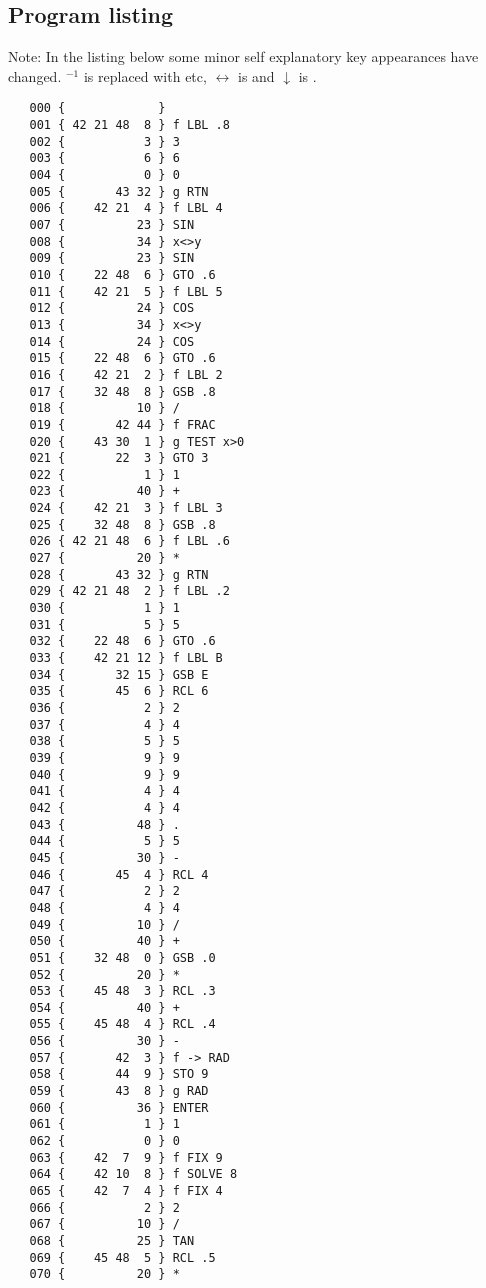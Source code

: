 \documentclass[swedish,a4paper,onepage, 11pt]{scrbook}
\begin{document}
\subsection*{Program listing}

Note: In the listing below some minor self explanatory key appearances have changed.  $^{-1}$ is replaced with  etc, $\leftrightarrow$ is  and $\downarrow$ is .
\begin{multicols}{2}
\begin{lstlisting}
   000 {             } 
   001 { 42 21 48  8 } f LBL .8
   002 {           3 } 3
   003 {           6 } 6
   004 {           0 } 0
   005 {       43 32 } g RTN
   006 {    42 21  4 } f LBL 4
   007 {          23 } SIN
   008 {          34 } x<>y
   009 {          23 } SIN
   010 {    22 48  6 } GTO .6
   011 {    42 21  5 } f LBL 5
   012 {          24 } COS
   013 {          34 } x<>y
   014 {          24 } COS
   015 {    22 48  6 } GTO .6
   016 {    42 21  2 } f LBL 2
   017 {    32 48  8 } GSB .8
   018 {          10 } /
   019 {       42 44 } f FRAC
   020 {    43 30  1 } g TEST x>0
   021 {       22  3 } GTO 3
   022 {           1 } 1
   023 {          40 } +
   024 {    42 21  3 } f LBL 3
   025 {    32 48  8 } GSB .8
   026 { 42 21 48  6 } f LBL .6
   027 {          20 } *
   028 {       43 32 } g RTN
   029 { 42 21 48  2 } f LBL .2
   030 {           1 } 1
   031 {           5 } 5
   032 {    22 48  6 } GTO .6
   033 {    42 21 12 } f LBL B
   034 {       32 15 } GSB E
   035 {       45  6 } RCL 6
   036 {           2 } 2
   037 {           4 } 4
   038 {           5 } 5
   039 {           9 } 9
   040 {           9 } 9
   041 {           4 } 4
   042 {           4 } 4
   043 {          48 } .
   044 {           5 } 5
   045 {          30 } -
   046 {       45  4 } RCL 4
   047 {           2 } 2
   048 {           4 } 4
   049 {          10 } /
   050 {          40 } +
   051 {    32 48  0 } GSB .0
   052 {          20 } *
   053 {    45 48  3 } RCL .3
   054 {          40 } +
   055 {    45 48  4 } RCL .4
   056 {          30 } -
   057 {       42  3 } f -> RAD
   058 {       44  9 } STO 9
   059 {       43  8 } g RAD
   060 {          36 } ENTER
   061 {           1 } 1
   062 {           0 } 0
   063 {    42  7  9 } f FIX 9
   064 {    42 10  8 } f SOLVE 8
   065 {    42  7  4 } f FIX 4
   066 {           2 } 2
   067 {          10 } /
   068 {          25 } TAN
   069 {    45 48  5 } RCL .5
   070 {          20 } *

\end{lstlisting}
\end{multicols}
\end{document}
